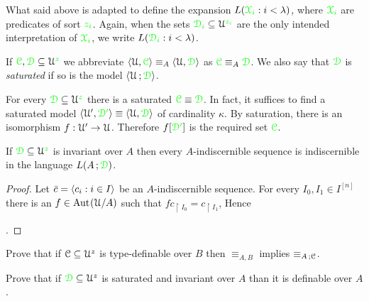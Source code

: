 What said above is adapted to define the expansion  \emph{$L({\color{green}\EuScript X_i}:i<\lambda)$,} where ${\color{green}\EuScript X_i}$ are predicates of sort ${\color{green} z_i}$.
Again, when the sets ${\color{green}\EuScript D_i}\subseteq\EuScript U^{\color{green} z_i}$ are the only intended interpretation of  ${\color{green}\EuScript X_i}$, we write \emph{$L({\color{green}\EuScript D_i}:i<\lambda)$.}

\begin{definition}\label{def_ins_sat}
  If ${\color{green}\EuScript C},{\color{green}\EuScript D}\subseteq\EuScript U^{\color{green} z}$ we abbreviate $\langle\EuScript U,{\color{green}\EuScript C}\rangle\equiv_A\langle\EuScript U,{\color{green}\EuScript D}\rangle$ as ${\color{green}\EuScript C}\equiv_A{\color{green}\EuScript D}$.
We also say that ${\color{green}\EuScript D}$ is \emph{saturated\/} if so is the model $\langle\EuScript U\,;{\color{green}\EuScript D}\rangle$.
\end{definition}

\begin{remark}\label{rem_el_sat}
For every ${\color{green}\EuScript D}\subseteq\EuScript U^{\color{green} z}$ there is a saturated ${\color{green}\EuScript C}\equiv{\color{green}\EuScript D}$.
In fact, it suffices to find a saturated model $\langle\EuScript U',{\color{green}\EuScript D'}\rangle\equiv\langle\EuScript U,{\color{green}\EuScript D}\rangle$ of cardinality $\kappa$.
By saturation, there is an isomorphism $f:\EuScript U'\to\EuScript U$.
Therefore $f[{\color{green}\EuScript D'}]$ is the required set ${\color{green}\EuScript C}$.
\end{remark}

\begin{proposition}\label{prop_indiscernible_L(A,D)}
  If ${\color{green}\EuScript D}\subseteq\EuScript U^{\color{green} z}$ is invariant over $A$ then every $A$-indiscernible sequence is indiscernible in the language $L(A\,;{\color{green}\EuScript D})$.
\end{proposition}

\begin{proof}
  Let $\bar c=\langle c_i:i\in I\rangle$ be an $A$-indiscernible sequence.
  For every $I_0,I_1\in I^{[n]}$ there is an $f\in{\rm Aut\kern.15ex}(\EuScript U/A)$ such that $fc_{\restriction I_0}=c_{\restriction I_1}$, Hence 

  .
\end{proof}

\begin{exercise}
  Prove that if $\EuScript C\subseteq\EuScript U^z$ is type-definable over $B$ then $\equiv_{A,B}$ implies $\equiv_{A\,;\EuScript C}$.
\end{exercise} 

\begin{exercise}
  Prove that if ${\color{green}\EuScript D}\subseteq\EuScript U^z$ is saturated and invariant over $A$ than it is definable over $A$.
\end{exercise} 



